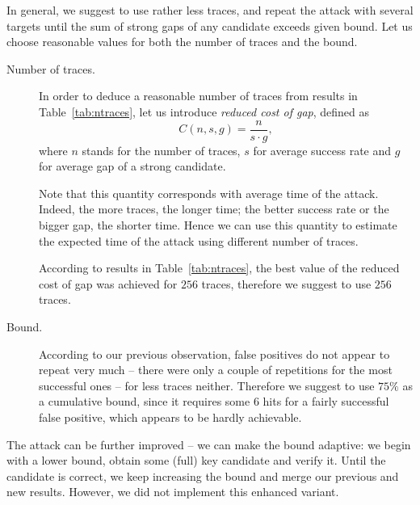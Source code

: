 In general, we suggest to use rather less traces, and repeat the attack with several targets until the sum of strong gaps of any candidate exceeds given bound. Let us choose reasonable values for both the number of traces and the bound.
\begin{description}
	\item[Number of traces.]
		In order to deduce a reasonable number of traces from results in Table~\ref{tab:ntraces}, let us introduce {\em reduced cost of gap}, defined as
		\begin{equation*}
			C(n, s, g) = \frac{n}{s\cdot g} ,
		\end{equation*}
		where $n$ stands for the number of traces, $s$ for average success rate and $g$ for average gap of a strong candidate.
		
		Note that this quantity corresponds with average time of the attack. Indeed, the more traces, the longer time; the better success rate or the bigger gap, the shorter time. Hence we can use this quantity to estimate the expected time of the attack using different number of traces.
		
		According to results in Table~\ref{tab:ntraces}, the best value of the reduced cost of gap was achieved for $256$ traces, therefore we suggest to use $256$ traces.
	\item[Bound.]
		According to our previous observation, false positives do not appear to repeat very much -- there were only a couple of repetitions for the most successful ones -- for less traces neither. %
		Therefore we suggest to use $75\%$ as a cumulative bound, since it requires some $6$ hits for a fairly successful false positive, which appears to be hardly achievable.
\end{description}

\begin{remark}
\label{rem:attimpr}
	The attack can be further improved -- we can make the bound adaptive: we begin with a lower bound, obtain some (full) key candidate and verify it. Until the candidate is correct, we keep increasing the bound and merge our previous and new results. However, we did not implement this enhanced variant.
\end{remark}
